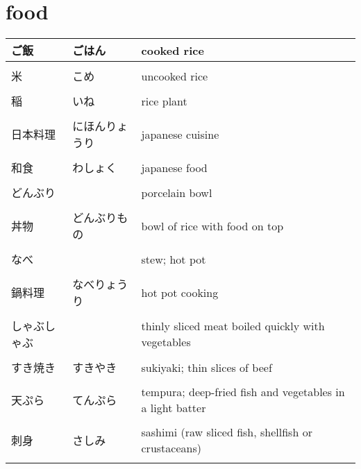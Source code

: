 \documentclass{article}
\newcommand\tabni[1][0.2cm]{\hspace*{#1}}
\begin{document}
\section{ \tabni food}
\begin{tabular}{ l | l | p{11.5cm} }														%
ご飯            &ごはん                         &cooked rice \\ \hline \\[-1em]
米              &こめ                           &uncooked rice \\ \hline \\[-1em]
稲              &いね                           &rice plant \\ \hline \\[-1em]
日本料理        &にほんりょうり                 &japanese cuisine \\ \hline \\[-1em]
和食            &わしょく                       &japanese food \\ \hline \\[-1em]
どんぶり        &                               &porcelain bowl \\ \hline \\[-1em]
丼物            &どんぶりもの                   &bowl of rice with food on top \\ \hline \\[-1em]
なべ            &                               &stew; hot pot \\ \hline \\[-1em]
鍋料理          &なべりょうり                   &hot pot cooking \\ \hline \\[-1em]
しゃぶしゃぶ    &                               &thinly sliced meat boiled quickly with vegetables \\ \hline \\[-1em]
すき焼き        &すきやき                       &sukiyaki; thin slices of beef \\ \hline \\[-1em]
天ぷら          &てんぷら                       &tempura; deep-fried fish and vegetables in a light batter \\ \hline \\[-1em]
刺身            &さしみ                         &sashimi (raw sliced fish, shellfish or crustaceans) \\ \hline \\[-1em]

\end{tabular}
\end{document}
